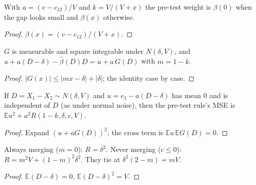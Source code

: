 \begin{lemma}\label{lem:pretest_weight_merging}
  \leanok
  With $a = (v - c_{12})/V$ and $k = V/(V + x)$ the pre-test weight is
  $\beta(0)$ when the gap looks small and $\beta(x)$ otherwise.
\end{lemma}
\begin{proof}
  \leanok
  $\beta(x) = (v - c_{12})/(V + x)$.
\end{proof}

\begin{lemma}\label{lem:pretest_tech}
  \leanok
  $G$ is measurable and square integrable under $N(\delta, V)$, and
  $u + a(D - \delta) - \hat\beta(D)D = u + a\,G(D)$ with $m = 1 - k$.
\end{lemma}
\begin{proof}
  \leanok
  $|G(x)| \le |mx - \delta| + |\delta|$; the identity case by case.
\end{proof}

\begin{theorem}\label{thm:pretest_reduction}
  \leanok
  If $D = X_1 - X_2 \sim N(\delta, V)$ and $u = e_1 - a(D - \delta)$ has mean $0$
  and is independent of $D$ (as under normal noise), then the pre-test rule's
  MSE is $\mathbb E u^2 + a^2 R(1 - k, \delta, c, V)$.
\end{theorem}
\begin{proof}
  \leanok
  Expand $(u + aG(D))^2$; the cross term is $\mathbb E u\,\mathbb E G(D) = 0$.
\end{proof}

\begin{lemma}\label{lem:gapRisk_fixed}
  \leanok
  Always merging ($m = 0$): $R = \delta^2$. Never merging ($c \le 0$):
  $R = m^2V + (1 - m)^2\delta^2$. They tie at $\delta^2(2 - m) = mV$.
\end{lemma}
\begin{proof}
  \leanok
  $\mathbb E(D - \delta) = 0$, $\mathbb E(D - \delta)^2 = V$.
\end{proof}

